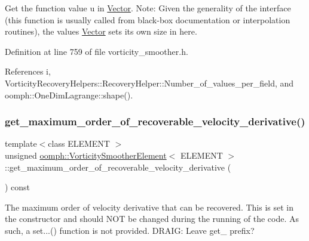 Get the function value u in \hyperlink{classoomph_1_1Vector}{Vector}. Note\+: Given the generality of the interface (this function is usually called from black-\/box documentation or interpolation routines), the values \hyperlink{classoomph_1_1Vector}{Vector} sets its own size in here. 



Definition at line 759 of file vorticity\+\_\+smoother.\+h.



References i, Vorticity\+Recovery\+Helpers\+::\+Recovery\+Helper\+::\+Number\+\_\+of\+\_\+values\+\_\+per\+\_\+field, and oomph\+::\+One\+Dim\+Lagrange\+::shape().

\mbox{\label{classoomph_1_1VorticitySmootherElement_ab4a59ee60f1d6591594fe9d7169f75bc}} 
\subsubsection{\texorpdfstring{get\+\_\+maximum\+\_\+order\+\_\+of\+\_\+recoverable\+\_\+velocity\+\_\+derivative()}{get\_maximum\_order\_of\_recoverable\_velocity\_derivative()}}
{\footnotesize\ttfamily template$<$class E\+L\+E\+M\+E\+NT $>$ \\
unsigned \hyperlink{classoomph_1_1VorticitySmootherElement}{oomph\+::\+Vorticity\+Smoother\+Element}$<$ E\+L\+E\+M\+E\+NT $>$\+::get\+\_\+maximum\+\_\+order\+\_\+of\+\_\+recoverable\+\_\+velocity\+\_\+derivative (\begin{DoxyParamCaption}{ }\end{DoxyParamCaption}) const\hspace{0.3cm}{\ttfamily [inline]}}



The maximum order of velocity derivative that can be recovered. This is set in the constructor and should N\+OT be changed during the running of the code. As such, a set...() function is not provided. D\+R\+A\+IG\+: Leave get\+\_\+ prefix? 



